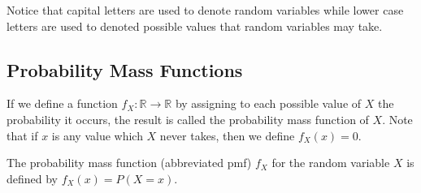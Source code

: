 \rmk Notice that capital letters are used to denote random variables while lower case letters are used to denoted possible values that random variables may take.

\subsection*{Probability Mass Functions}
\par
If we define a function $f_X: \mathbb{R} \to \mathbb{R}$ by assigning to each possible value of $X$ the probability it occurs, the result is called the probability mass function of $X$. Note that if $x$ is any value which $X$ never takes, then we define $f_X(x) = 0$.

\begin{defn}
The probability mass function (abbreviated pmf) $f_X$ for the random variable $X$ is defined by $f_X(x) = P(X = x)$.
\end{defn}

